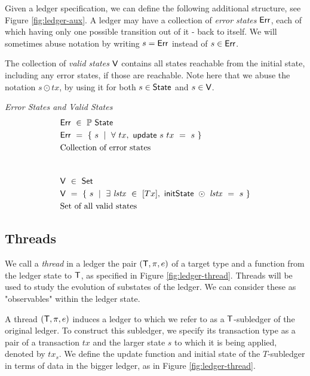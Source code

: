 Given a ledger specification, we can define the following additional structure,
see Figure \ref{fig:ledger-aux}. A ledger may have a collection of \emph{error states} $\mathsf{Err}$,
each of which having only one possible transition out of it - back to itself.
We will sometimes abuse notation by writing $s = \mathsf{Err}$ instead of $s \in \mathsf{Err}$.

The collection of \emph{valid states} $\mathsf{V}$ contains all states reachable from the initial state,
including any error states, if those are reachable. Note here that we abuse the
notation $s \odot tx$, by using it for both $s \in \mathsf{State}$ and $s \in \mathsf{V}$.


\begin{figure*}[htb]
    \emph{Error States and Valid States}
    \begin{align*}
      & \Err ~\in~ \powerset{\State} \\
      & \Err ~=~ \{~s~\mid~\forall~tx,~\ups~s~tx~=~s~\} \\
      & \text{Collection of error states} \\
      \nextdef
      & \V ~\in~ \Set \\
      & \V ~=~
          \{ ~s~ \mid ~\exists~\var{lstx}~\in~[Tx],~\fun{initState}~\odot~\var{lstx}~=~s~\} \\
      & \text{Set of all valid states} \\
    \end{align*}
  \caption{Ledger specification additional structure}
  \label{fig:ledger-aux}
\end{figure*}

\pagebreak

\subsection{Threads}
\label{sec:threads}

We call a \emph{thread} in a ledger the pair $(\mathsf{T}, \pi, e)$ of a target type and a function
from the ledger state to $\mathsf{T}$, as specified in Figure \ref{fig:ledger-thread}.
Threads will be used to study the evolution of substates
of the ledger. We can consider these as "observables" within the ledger state.

A thread $(\mathsf{T}, \pi, e)$ induces a ledger to which we refer
to as a $\mathsf{T}$-subledger of the original ledger. To construct
this subledger, we specify its transaction type as a pair of a transaction $tx$
and the larger state $s$
to which it is being applied, denoted by $tx_s$. We define the
update function and initial state of the $T$-subledger in terms of data in the
bigger ledger, as in Figure \ref{fig:ledger-thread}.


